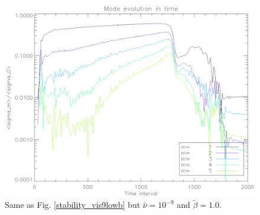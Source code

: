 \begin{figure}
   \includegraphics[scale=.42]{figures/stability_vis9betamed.ps}
   \caption{Same as Fig. \ref{stability_vis9lowb} but $\hat{\nu}=10^{-9}$ and $\tilde{\beta}=1.0$. }
 \label{stability_vis9medb)}
 \end{figure}



